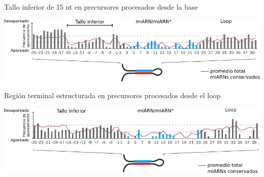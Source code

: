 \documentclass{beamer}
\begin{document}
\begin{frame}{Tallo inferior de 15 nt en precursores procesados desde la base}
	\begin{center}
		\includegraphics[width=1\textwidth]{img/GR_fig2C.png}
	\end{center}
\end{frame}

\begin{frame}{Región terminal estructurada en precursores procesados desde el loop}
	\begin{center}
		\includegraphics[width=1\textwidth]{img/GR_fig4C.png}
	\end{center}
\end{frame}
\end{document}
